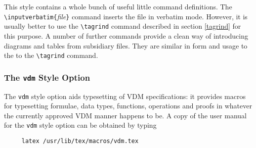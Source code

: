 This style contains a whole bunch of useful little command
definitions.  The \verb|\inputverbatim{|{\it file\/}\verb|}|
command inserts the file in verbatim mode.  However, it is usually
better to use the \verb|\tagrind| command described in section
\ref{tagrind} for this purpose.  A number of further commands
provide a clean way of introducing diagrams and tables from
subsidiary files.  They are similar in form and usage to the to the
\verb|\tagrind| command.

\subsubsection{The {\tt vdm} Style Option}

The {\tt vdm} style option aids typesetting of VDM specifications: it
provides macros for typesetting formulae, data types, functions,
operations and proofs in whatever the currently approved VDM manner
happens to be.  A copy of the user manual for the {\tt vdm} style option
can be obtained by typing
\begin{verbatim}
     latex /usr/lib/tex/macros/vdm.tex
\end{verbatim}

